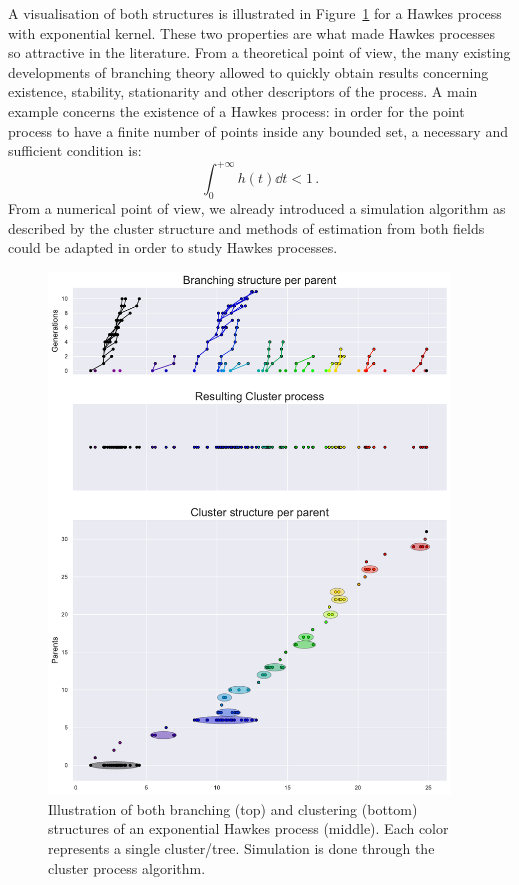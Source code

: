     A visualisation of both structures is illustrated in Figure~\ref{fig:branching_and_cluster05} for a Hawkes process with exponential kernel. 
    These two properties are what made Hawkes processes so attractive in the literature.
    From a theoretical point of view, the many existing developments of branching theory allowed to quickly obtain results concerning existence, stability, stationarity and other descriptors of the process.
    A main example concerns the existence of a Hawkes process: in order for the point process to have a finite number of points inside any bounded set, a necessary and sufficient condition is:
    \[\int_{0}^{+\infty}{h(t)\dd t} < 1\,.\]
    From a numerical point of view, we already introduced a simulation algorithm as described by the cluster structure and methods of estimation from both fields could be adapted in order to study Hawkes processes.
    
    \begin{figure}[!ht]
        \centering
          \includegraphics[width=0.95\textwidth]{images/chapter0/branching_and_cluster05.pdf}
        \caption{Illustration of both branching (top) and clustering (bottom) structures of an exponential Hawkes process (middle). Each color represents a single cluster/tree. Simulation is done through the cluster process algorithm.
        }
        \label{fig:branching_and_cluster05}
      \end{figure}

